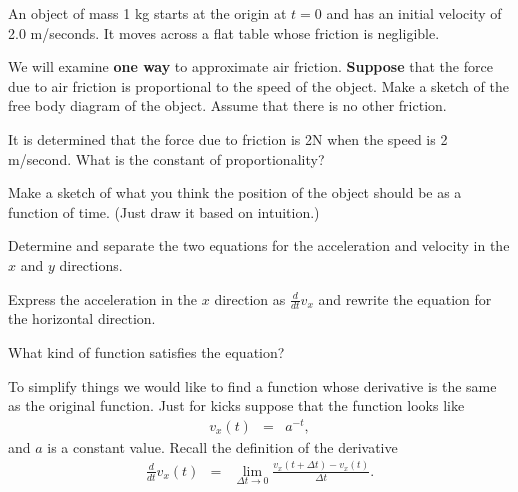 \begin{problem}
\item An object of mass 1 kg starts at the origin at $t=0$ and has an
  initial velocity of 2.0 m/seconds. It moves across a flat table
  whose friction is negligible.
  \begin{subproblem}
  \item We will examine \textbf{one way} to approximate air friction.
    \textbf{Suppose} that the force due to air friction is
    proportional to the speed of the object.  Make a sketch of the
    free body diagram of the object. Assume that there is no other
    friction.  

    \vfill

  \item It is determined that the force due to friction is 2N when the
    speed is 2 m/second. What is the constant of proportionality? 

    \vspace{4em}

  \item Make a sketch of what you think the position of the object
    should be as a function of time. (Just draw it based on
    intuition.)

    \vfill

    \clearpage
    
  \item Determine and separate the two equations for the acceleration
    and velocity in the $x$ and $y$ directions.

    \vfill

  \item Express the acceleration in the $x$ direction as $\frac{d}{dt}
    v_x$ and rewrite the equation for the horizontal direction.
    \vspace{4em}

  \item What kind of function satisfies the equation?

    \vspace{4em}

  \end{subproblem}

  \clearpage

\item To simplify things we would like to find a function whose
  derivative is the same as the original function. Just for kicks
  suppose that the function looks like
  \begin{eqnarray*}
    v_x(t) & = & a^{-t},
  \end{eqnarray*}
  and $a$ is a constant value. Recall the definition of the derivative
  \begin{eqnarray*}
    \frac{d}{dt} v_x(t) & = & \lim_{\Delta t \rightarrow 0}
                              \frac{v_x(t+\Delta t) - v_x(t)}{\Delta t}.
  \end{eqnarray*}


\end{problem}
